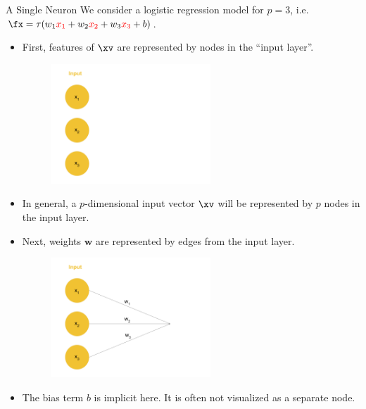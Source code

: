 \begin{vbframe} {A Single Neuron}
We consider a logistic regression model for $p = 3$, i.e. $\fx = \tau(w_1\textcolor{red}{x_1} + w_2\textcolor{red}{x_2} + w_3\textcolor{red}{x_3} + b)$.
\begin{itemize}
\item First, features of $\xv$ are represented by nodes in the \enquote{input layer}.
\begin{figure}
\includegraphics[width=6cm]{figure/neurep_one.png}
\end{figure}
\item In general, a $p$-dimensional input vector $\xv$ will be represented by $p$ nodes in the input layer.
\framebreak

\item Next, weights $\mathbf{w}$ are represented by edges from the input layer.
\begin{figure}
\includegraphics[width=6cm]{figure/neurep_two.png}
\end{figure}
\item The bias term $b$ is implicit here. It is often not visualized as a separate node.
\end{itemize}
\framebreak


\end{vbframe}
